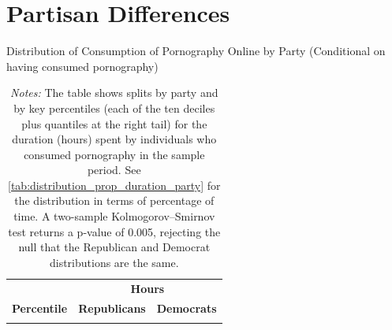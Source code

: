 \documentclass[12pt, letterpaper]{article}
\begin{document}
\FloatBarrier
\clearpage
\section{Partisan Differences}


\begin{table}[ht] \centering \small \setlength\tabcolsep{10 pt}
	\caption{Distribution of Consumption of Pornography Online by Party (Conditional on having consumed pornography)}
	\label{tab:distribution_duration_party}
	\begin{adjustbox}{max width=\textwidth}
		\begin{tabular}{crr}
			\toprule
			\multicolumn{1}{l}{\textbf{}}&\multicolumn{2}{c}{\textbf{Hours}}\\
			\cmidrule(l){2-3}
			\multicolumn{1}{l}{\textbf{Percentile}}&\multicolumn{1}{c}{\textbf{Republicans}}&\multicolumn{1}{c}{\textbf{Democrats}}\\
			\midrule
			\\
			\bottomrule
		\end{tabular}
	\end{adjustbox}
	\caption*{\footnotesize \emph{Notes:} 
		The table shows splits by party and by key percentiles (each of the ten deciles plus quantiles at the right tail) for the duration (hours) spent by individuals who consumed pornography in the sample period. 
		See \cref{tab:distribution_prop_duration_party} for the distribution in terms of percentage of time. 
		A two-sample Kolmogorov–Smirnov test returns a p-value of 0.005, rejecting the null that the Republican and Democrat distributions are the same.
	}
\end{table}
\end{document}
